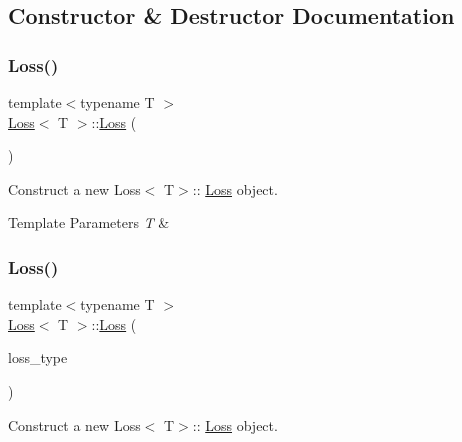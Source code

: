 \subsection{Constructor \& Destructor Documentation}
\mbox{\label{class_loss_a76394ddc3da09eb5d4929e1ea03a667c}} 
\subsubsection{\texorpdfstring{Loss()}{Loss()}\hspace{0.1cm}{\footnotesize\ttfamily [1/2]}}
{\footnotesize\ttfamily template$<$typename T $>$ \\
\mbox{\hyperlink{class_loss}{Loss}}$<$ T $>$\+::\mbox{\hyperlink{class_loss}{Loss}} (\begin{DoxyParamCaption}{ }\end{DoxyParamCaption})}



Construct a new Loss$<$ T$>$\+:: \mbox{\hyperlink{class_loss}{Loss}} object. 


\begin{DoxyTemplParams}{Template Parameters}
{\em T} & \\
\hline
\end{DoxyTemplParams}
\mbox{\label{class_loss_a5b75c55ce90781d1b12d02f1bedbfa4f}} 
\subsubsection{\texorpdfstring{Loss()}{Loss()}\hspace{0.1cm}{\footnotesize\ttfamily [2/2]}}
{\footnotesize\ttfamily template$<$typename T $>$ \\
\mbox{\hyperlink{class_loss}{Loss}}$<$ T $>$\+::\mbox{\hyperlink{class_loss}{Loss}} (\begin{DoxyParamCaption}\item[{\mbox{\hyperlink{loss_8hpp_a72b6675b9bd68360ebc6e54006d8220f}{L\+O\+S\+S\+\_\+\+T\+Y\+PE}}}]{loss\+\_\+type }\end{DoxyParamCaption})}



Construct a new Loss$<$ T$>$\+:: \mbox{\hyperlink{class_loss}{Loss}} object. 


